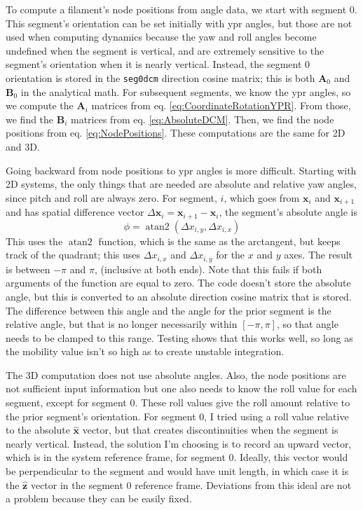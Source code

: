 \documentclass {scrbook}
\DeclareMathOperator{\atantwo}{atan2}
\newcommand {\ttt} {\texttt}
\begin{document}
To compute a filament's node positions from angle data, we start with segment 0. This segment's orientation can be set initially with ypr angles, but those are not used when computing dynamics because the yaw and roll angles become undefined when the segment is vertical, and are extremely sensitive to the segment's orientation when it is nearly vertical. Instead, the segment 0 orientation is stored in the \ttt{seg0dcm} direction cosine matrix; this is both $\bm{A}_0$ and $\bm{B}_0$ in the analytical math. For subsequent segments, we know the ypr angles, so we compute the $\bm{A}_i$ matrices from eq. \ref{eq:CoordinateRotationYPR}. From those, we find the $\bm{B}_i$ matrices from eq. \ref{eq:AbsoluteDCM}. Then, we find the node positions from eq. \ref{eq:NodePositions}. These computations are the same for 2D and 3D.

Going backward from node positions to ypr angles is more difficult. Starting with 2D systems, the only things that are needed are absolute and relative yaw angles, since pitch and roll are always zero. For segment, $i$, which goes from $\bm{x}_i$ and $\bm{x}_{i+1}$ and has spatial difference vector $\Delta \bm{x}_i=\bm{x}_{i+1} - \bm{x}_{i}$, the segment's absolute angle is
$$\phi = \atantwo(\Delta x_{i,y},\Delta x_{i,x})$$
This uses the $\atantwo$ function, which is the same as the arctangent, but keeps track of the quadrant; this uses $\Delta x_{i,x}$ and $\Delta x_{i,y}$ for the $x$ and $y$ axes. The result is between $-\pi$ and $\pi$, (inclusive at both ends). Note that this fails if both arguments of the function are equal to zero. The code doesn't store the absolute angle, but this is converted to an absolute direction cosine matrix that is stored. The difference between this angle and the angle for the prior segment is the relative angle, but that is no longer necessarily within $[-\pi,\pi]$, so that angle needs to be clamped to this range. Testing shows that this works well, so long as the mobility value isn't so high as to create unstable integration.

The 3D computation does not use absolute angles. Also, the node positions are not sufficient input information but one also needs to know the roll value for each segment, except for segment 0. These roll values give the roll amount relative to the prior segment's orientation. For segment 0, I tried using a roll value relative to the absolute $\hat{\bm{x}}$ vector, but that creates discontinuities when the segment is nearly vertical. Instead, the solution I'm choosing is to record an upward vector, which is in the system reference frame, for segment 0. Ideally, this vector would be perpendicular to the segment and would have unit length, in which case it is the $\hat{\bm{z}}$ vector in the segment 0 reference frame. Deviations from this ideal are not a problem because they can be easily fixed.
\end{document}
